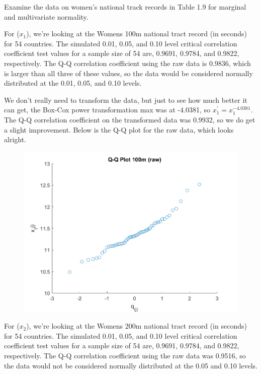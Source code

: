 Examine the data on women's national track records in Table 1.9 for marginal and multivariate normality.

For ($x_{1}$), we're looking at the Womens 100m national tract record (in seconds) for 54 countries. The simulated 0.01, 0.05, and 0.10 level critical correlation coefficient test values for a sample size of 54 are, 0.9691, 0.9784, and 0.9822, respectively. The Q-Q correlation coefficient using the raw data is 0.9836, which is larger than all three of these values, so the data would be considered normally distributed at the 0.01, 0.05, and 0.10 levels.

We don't really need to transform the data, but just to see how much better it can get, the Box-Cox power transformation max was at -4.0381, so $x_{1}^{\prime} = x_{1}^{-4.0381}$. The Q-Q correlation coefficient on the transformed data was 0.9932, so we do get a slight improvement. Below is the Q-Q plot for the raw data, which looks alright.

\begin{center}
    \begin{figure}[H]
        \centering
        \includegraphics[scale=0.6]{./matlab/chapter-4/sol4.36.qq.1.png}
    \end{figure}
\end{center}

For ($x_{2}$), we're looking at the Womens 200m national tract record (in seconds) for 54 countries. The simulated 0.01, 0.05, and 0.10 level critical correlation coefficient test values for a sample size of 54 are, 0.9691, 0.9784, and 0.9822, respectively. The Q-Q correlation coefficient using the raw data was 0.9516, so the data would not be considered normally distributed at the 0.05 and 0.10 levels.

